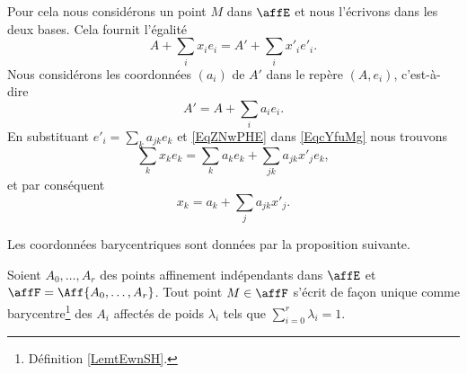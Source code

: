 Pour cela nous considérons un point \( M\) dans \( \affE\) et nous l'écrivons dans les deux bases. Cela fournit l'égalité
\begin{equation}        \label{EqcYfuMg}
	A+\sum_ix_ie_i=A'+\sum_ix'_ie'_i.
\end{equation}
Nous considérons les coordonnées \( (a_i)\) de \( A'\) dans le repère \( (A,e_i)\), c'est-à-dire
\begin{equation}    \label{EqZNwPHE}
	A'=A+\sum_ia_ie_i.
\end{equation}
En substituant \( e'_i=\sum_ka_{jk}e_k\) et \eqref{EqZNwPHE} dans \eqref{EqcYfuMg} nous trouvons
\begin{equation}
	\sum_kx_ke_k=\sum_ka_ke_k+\sum_{jk}a_{jk}x'_je_k,
\end{equation}
et par conséquent
\begin{equation}
	x_k=a_k+\sum_ja_{jk}x'_j.
\end{equation}

Les coordonnées barycentriques sont données par la proposition suivante.
\begin{proposition}      \label{PROPooTIRXooLAipRa}
	Soient \( A_0,\ldots, A_r\) des points affinement indépendants dans \( \affE\) et \( \affF=\Aff\{ A_0,\ldots, A_r \}\). Tout point \( M\in\affF\) s'écrit de façon unique comme barycentre\footnote{Définition \ref{LemtEwnSH}.} des \( A_i\) affectés de poids \( \lambda_i\) tels que \( \sum_{i=0}^r\lambda_i=1\).
\end{proposition}

